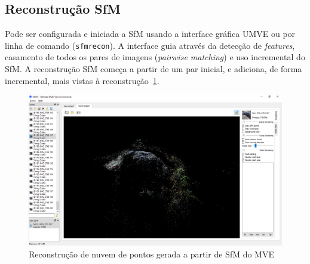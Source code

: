 \subsection*{Reconstrução SfM}

Pode ser configurada e iniciada a SfM usando a interface gráfica UMVE ou por linha de
comando (\texttt{sfmrecon}). A interface guia através da detecção de
\emph{features}, casamento de todos os pares de imagens (\emph{pairwise matching}) e uso
incremental do SfM. A reconstrução SfM começa a partir de um
par inicial, e adiciona, de forma incremental, mais vistas à
reconstrução~\ref{fig:mvesfm}.

\begin{figure}[!h]
	\centering
	\includegraphics[width=\linewidth]{figs/umve5sfm.png}
	\caption{%
  Reconstrução de nuvem de pontos gerada a partir de
  SfM do MVE%
	}\label{fig:mvesfm}
\end{figure}


%
